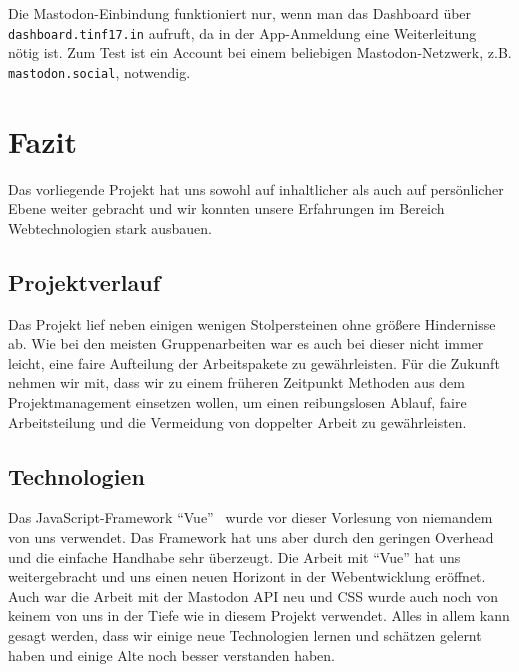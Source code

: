 \documentclass[fleqn,10pt]{SelfArx} %
\begin{document}
Die Mastodon-Einbindung funktioniert nur, wenn man das Dashboard über \texttt{dashboard.tinf17.in} aufruft, da in der App-Anmeldung eine Weiterleitung nötig ist. Zum Test ist ein Account bei einem beliebigen Mastodon-Netzwerk, z.B. \texttt{mastodon.social}, notwendig.
\section{Fazit}
Das vorliegende Projekt hat uns sowohl auf inhaltlicher als auch auf persönlicher Ebene weiter gebracht und wir konnten unsere Erfahrungen im Bereich Webtechnologien stark ausbauen.
\subsection{Projektverlauf}
Das Projekt lief neben einigen wenigen Stolpersteinen ohne größere Hindernisse ab. Wie bei den meisten Gruppenarbeiten war es auch bei dieser nicht immer leicht, eine faire Aufteilung der Arbeitspakete zu gewährleisten. Für die Zukunft nehmen wir mit, dass wir zu einem früheren Zeitpunkt Methoden aus dem Projektmanagement einsetzen wollen, um einen reibungslosen Ablauf, faire Arbeitsteilung und die Vermeidung von doppelter Arbeit zu gewährleisten.
\subsection{Technologien}
Das JavaScript-Framework \enquote{Vue}~\cite{vue} wurde vor dieser Vorlesung von niemandem von uns verwendet. Das Framework hat uns aber durch den geringen Overhead und die einfache Handhabe sehr überzeugt. Die Arbeit mit \enquote{Vue} hat uns weitergebracht und uns einen neuen Horizont in der Webentwicklung eröffnet. 
Auch war die Arbeit mit der Mastodon API neu und CSS wurde auch noch von keinem von uns in der Tiefe wie in diesem Projekt verwendet. Alles in allem kann gesagt werden, dass wir einige neue Technologien lernen und schätzen gelernt haben und einige Alte noch besser verstanden haben.
\end{document}

